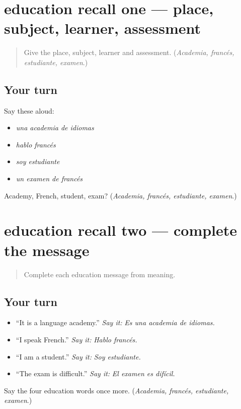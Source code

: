 \section[(review)]{education recall one — place, subject, learner, assessment}

\label{lesson:ES-C410-education-recall-1}



\begin{quote}
Give the place, subject, learner and assessment. (\emph{Academia, francés, estudiante, examen}.)
\end{quote}

\subsection*{Your turn}
Say these aloud:

\begin{itemize}
\raggedright
  \item \emph{una academia de idiomas}
  \item \emph{hablo francés}
  \item \emph{soy estudiante}
  \item \emph{un examen de francés}
\end{itemize}

\begin{tcolorbox}[breakable,colback=teal!4,colframe=teal!35!black,title={Before you move on}]
Academy, French, student, exam? (\emph{Academia, francés, estudiante, examen}.)
\end{tcolorbox}
\section[(review)]{education recall two — complete the message}

\label{lesson:ES-C410-education-recall-2}



\begin{quote}
Complete each education message from meaning.
\end{quote}

\subsection*{Your turn}
\begin{itemize}
\raggedright
  \item “It is a language academy.” \emph{Say it:} \emph{Es una academia de idiomas.}
  \item “I speak French.” \emph{Say it:} \emph{Hablo francés.}
  \item “I am a student.” \emph{Say it:} \emph{Soy estudiante.}
  \item “The exam is difficult.” \emph{Say it:} \emph{El examen es difícil.}
\end{itemize}

\begin{tcolorbox}[breakable,colback=teal!4,colframe=teal!35!black,title={Before you move on}]
Say the four education words once more. (\emph{Academia, francés, estudiante, examen}.)
\end{tcolorbox}
